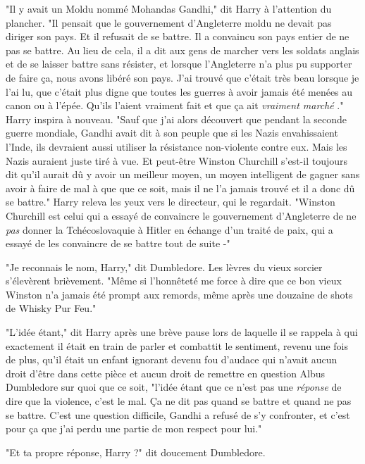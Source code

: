 "Il y avait un Moldu nommé Mohandas Gandhi," dit Harry à l'attention du plancher. "Il pensait que le gouvernement d'Angleterre moldu ne devait pas diriger son pays. Et il refusait de se battre. Il a convaincu son pays entier de ne pas se battre. Au lieu de cela, il a dit aux gens de marcher vers les soldats anglais et de se laisser battre sans résister, et lorsque l'Angleterre n'a plus pu supporter de faire ça, nous avons libéré son pays. J'ai trouvé que c'était très beau lorsque je l'ai lu, que c'était plus digne que toutes les guerres à avoir jamais été menées au canon ou à l'épée. Qu'ils l'aient vraiment fait et que ça ait \emph{vraiment marché} ." Harry inspira à nouveau. "Sauf que j'ai alors découvert que pendant la seconde guerre mondiale, Gandhi avait dit à son peuple que si les Nazis envahissaient l'Inde, ils devraient aussi utiliser la résistance non-violente contre eux. Mais les Nazis auraient juste tiré à vue. Et peut-être Winston Churchill s'est-il toujours dit qu'il aurait dû y avoir un meilleur moyen, un moyen intelligent de gagner sans avoir à faire de mal à que que ce soit, mais il ne l'a jamais trouvé et il a donc dû se battre." Harry releva les yeux vers le directeur, qui le regardait. "Winston Churchill est celui qui a essayé de convaincre le gouvernement d'Angleterre de ne \emph{pas}  donner la Tchécoslovaquie à Hitler en échange d'un traité de paix, qui a essayé de les convaincre de se battre tout de suite -"

"Je reconnais le nom, Harry," dit Dumbledore. Les lèvres du vieux sorcier s'élevèrent brièvement. "Même si l'honnêteté me force à dire que ce bon vieux Winston n'a jamais été prompt aux remords, même après une douzaine de shots de Whisky Pur Feu."

"L'idée étant," dit Harry après une brève pause lors de laquelle il se rappela à qui exactement il était en train de parler et combattit le sentiment, revenu une fois de plus, qu'il était un enfant ignorant devenu fou d'audace qui n'avait aucun droit d'être dans cette pièce et aucun droit de remettre en question Albus Dumbledore sur quoi que ce soit, "l'idée étant que ce n'est pas une \emph{réponse}  de dire que la violence, c'est le mal. Ça ne dit pas quand se battre et quand ne pas se battre. C'est une question difficile, Gandhi a refusé de s'y confronter, et c'est pour ça que j'ai perdu une partie de mon respect pour lui."

"Et ta propre réponse, Harry ?" dit doucement Dumbledore.

